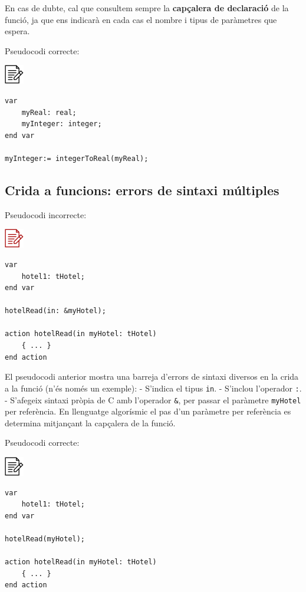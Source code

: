 \documentclass[
]{book}
\begin{document}
En cas de dubte, cal que consultem sempre la \textbf{capçalera de declaració} de la funció, ja que ens indicarà en cada cas el nombre i tipus de paràmetres que espera.

Pseudocodi correcte:

\includegraphics{./img/alg.png}

\begin{verbatim}
var
    myReal: real;
    myInteger: integer;
end var

myInteger:= integerToReal(myReal);
\end{verbatim}

\hypertarget{crida-a-funcions-errors-de-sintaxi-muxfaltiples}{%
\subsection{Crida a funcions: errors de sintaxi múltiples}\label{crida-a-funcions-errors-de-sintaxi-muxfaltiples}}

Pseudocodi incorrecte:

\includegraphics{./img/alg_err.png}

\begin{verbatim}
var
    hotel1: tHotel;
end var

hotelRead(in: &myHotel);

action hotelRead(in myHotel: tHotel)
    { ... }
end action
\end{verbatim}

El pseudocodi anterior mostra una barreja d'errors de sintaxi diversos en la crida a la funció (n'és només un exemple):
- S'indica el tipus \texttt{in}.
- S'inclou l'operador \texttt{:}.
- S'afegeix sintaxi pròpia de C amb l'operador \texttt{\&}, per passar el paràmetre \texttt{myHotel} per referència. En llenguatge algorísmic el pas d'un paràmetre per referència es determina mitjançant la capçalera de la funció.

Pseudocodi correcte:

\includegraphics{./img/alg.png}

\begin{verbatim}
var
    hotel1: tHotel;
end var

hotelRead(myHotel);

action hotelRead(in myHotel: tHotel)
    { ... }
end action
\end{verbatim}
\end{document}
